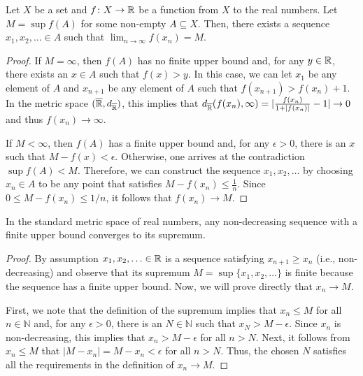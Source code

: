 \begin{lemma}
\label{lem:SupremumSequence}
Let $X$ be a set and $f \colon X\rightarrow \mathbb{R}$ be a function from $X$ to the real numbers.
Let $M = \sup f(A)$ for some non-empty $A \subseteq X$.
Then, there exists a sequence $x_1,x_2,\ldots \in A$ such that $\lim_{n\to \infty} f(x_n) = M$.
\end{lemma}
\begin{proof}
If $M=\infty$, then $f(A)$ has no finite upper bound and, for any $y\in \mathbb{R}$, there exists an $x\in A$ such that $f(x)>y$.
In this case, we can let $x_1$ be any element of $A$ and $x_{n+1}$ be any element of $A$ such that $f(x_{n+1}) > f(x_n) + 1$.
In the metric space $(\overline{\mathbb{R}},d_{\overline{\mathbb{R}}})$, this implies that $d_{\overline{\mathbb{R}}}(f(x_n),\infty) = |\frac{f(x_n)}{1+|f(x_n)|} - 1| \to 0$ and thus $f(x_n) \to \infty$.

If $M<\infty$, then $f(A)$ has a finite upper bound and, for any $\epsilon >0$, there is an $x$ such that $M-f(x)<\epsilon$.
Otherwise, one arrives at the contradiction $\sup f(A) < M$.
Therefore, we can construct the sequence $x_1,x_2,\ldots$ by choosing $x_n\in A$ to be any point that satisfies $M-f(x_n)\leq \frac{1}{n}$.
Since $0\leq M-f(x_n)\leq1/n$, it follows that $f(x_n)\to M$.
\end{proof}

\begin{theorem}
In the standard metric space of real numbers, any non-decreasing sequence with a finite upper bound converges to its supremum.
\end{theorem}
\begin{proof}
By assumption $x_1,x_2,\ldots \in \mathbb{R}$ is a sequence satisfying $x_{n+1} \geq x_n$ (i.e., non-decreasing) and observe that its supremum $M=\sup\{x_1,x_2,\ldots\}$ is finite because the sequence has a finite upper bound.
Now, we will prove directly that $x_n \to M$.

First, we note that the definition of the supremum implies that $x_n \leq M$ for all $n\in \mathbb{N}$ and, for any $\epsilon >0$, there is an $N\in \mathbb{N}$ such that $x_N > M-\epsilon$.
Since $x_n$ is non-decreasing, this implies that $x_n > M-\epsilon$ for all $n>N$.
Next, it follows from $x_n \leq M$ that $|M - x_n| = M-x_n < \epsilon$ for all $n>N$.
Thus, the chosen $N$ satisfies all the requirements in the definition of $x_n\to M$.
\end{proof}


